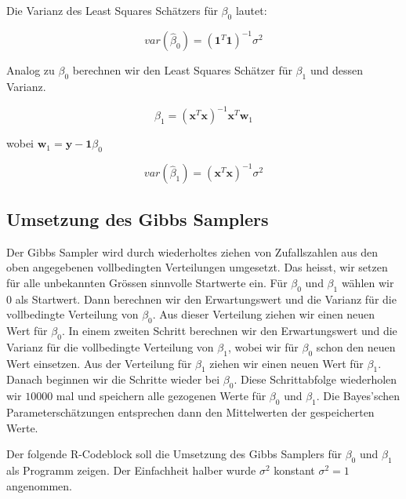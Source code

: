 \documentclass[]{book}
\begin{document}
Die Varianz des Least Squares Schätzers für \(\beta_0\) lautet:

\begin{equation}
var(\hat{\beta}_0) = (\mathbf{1}^T\mathbf{1})^{-1}\sigma^2
\label{eq:VarBeta0LsEst}
\end{equation}

Analog zu \(\beta_0\) berechnen wir den Least Squares Schätzer für
\(\beta_1\) und dessen Varianz.

\begin{equation}
\hat{\beta}_1 = (\mathbf{x}^T\mathbf{x})^{-1}\mathbf{x}^T\mathbf{w}_1
\label{eq:Beta1LsEst}
\end{equation}

wobei \(\mathbf{w}_1 = \mathbf{y} - \mathbf{1}\beta_0\)

\begin{equation}
var(\hat{\beta}_1) = (\mathbf{x}^T\mathbf{x})^{-1}\sigma^2
\label{eq:VarBeta1LsEst}
\end{equation}

\subsection{Umsetzung des Gibbs
Samplers}\label{umsetzung-des-gibbs-samplers}

Der Gibbs Sampler wird durch wiederholtes ziehen von Zufallszahlen aus
den oben angegebenen vollbedingten Verteilungen umgesetzt. Das heisst,
wir setzen für alle unbekannten Grössen sinnvolle Startwerte ein. Für
\(\beta_0\) und \(\beta_1\) wählen wir \(0\) als Startwert. Dann
berechnen wir den Erwartungswert und die Varianz für die vollbedingte
Verteilung von \(\beta_0\). Aus dieser Verteilung ziehen wir einen neuen
Wert für \(\beta_0\). In einem zweiten Schritt berechnen wir den
Erwartungswert und die Varianz für die vollbedingte Verteilung von
\(\beta_1\), wobei wir für \(\beta_0\) schon den neuen Wert einsetzen.
Aus der Verteilung für \(\beta_1\) ziehen wir einen neuen Wert für
\(\beta_1\). Danach beginnen wir die Schritte wieder bei \(\beta_0\).
Diese Schrittabfolge wiederholen wir \(10000\) mal und speichern alle
gezogenen Werte für \(\beta_0\) und \(\beta_1\). Die Bayes'schen
Parameterschätzungen entsprechen dann den Mittelwerten der gespeicherten
Werte.

Der folgende R-Codeblock soll die Umsetzung des Gibbs Samplers für
\(\beta_0\) und \(\beta_1\) als Programm zeigen. Der Einfachheit halber
wurde \(\sigma^2\) konstant \(\sigma^2=1\) angenommen.
\end{document}
